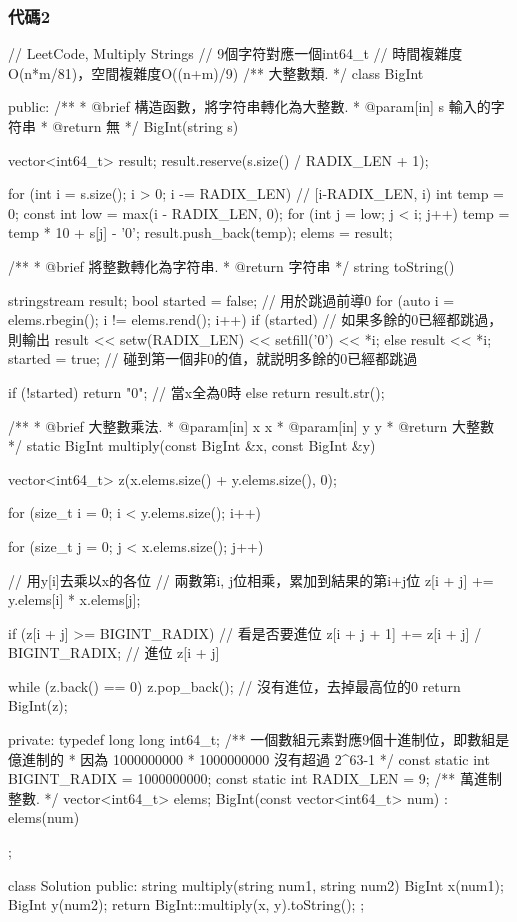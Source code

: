 \subsubsection{代碼2}
\begin{Code}
// LeetCode, Multiply Strings
// 9個字符對應一個int64_t
// 時間複雜度O(n*m/81)，空間複雜度O((n+m)/9)
/** 大整數類. */
class BigInt {
public:
    /**
     * @brief 構造函數，將字符串轉化為大整數.
     * @param[in] s 輸入的字符串
     * @return 無
     */
    BigInt(string s) {
        vector<int64_t> result;
        result.reserve(s.size() / RADIX_LEN + 1);

        for (int i = s.size(); i > 0; i -= RADIX_LEN) {  // [i-RADIX_LEN, i)
            int temp = 0;
            const int low = max(i - RADIX_LEN, 0);
            for (int j = low; j < i; j++) {
                temp = temp * 10 + s[j] - '0';
            }
            result.push_back(temp);
        }
        elems = result;
    }
    /**
     * @brief 將整數轉化為字符串.
     * @return 字符串
     */
    string toString() {
        stringstream result;
        bool started = false; // 用於跳過前導0
        for (auto i = elems.rbegin(); i != elems.rend(); i++) {
            if (started) { // 如果多餘的0已經都跳過，則輸出
                result << setw(RADIX_LEN) << setfill('0') << *i;
            } else {
                result << *i;
                started = true; // 碰到第一個非0的值，就説明多餘的0已經都跳過
            }
        }

        if (!started) return "0"; // 當x全為0時
        else return result.str();
    }

    /**
     * @brief 大整數乘法.
     * @param[in] x x
     * @param[in] y y
     * @return 大整數
     */
    static BigInt multiply(const BigInt &x, const BigInt &y) {
        vector<int64_t> z(x.elems.size() + y.elems.size(), 0);

        for (size_t i = 0; i < y.elems.size(); i++) {
            for (size_t j = 0; j < x.elems.size(); j++) { // 用y[i]去乘以x的各位
                //  兩數第i, j位相乘，累加到結果的第i+j位
                z[i + j] += y.elems[i] * x.elems[j];

                if (z[i + j] >= BIGINT_RADIX) { //  看是否要進位
                    z[i + j + 1] += z[i + j] / BIGINT_RADIX; //  進位
                    z[i + j] %
                }
            }
        }
        while (z.back() == 0) z.pop_back();  // 沒有進位，去掉最高位的0
        return BigInt(z);
    }

private:
    typedef long long int64_t;
    /** 一個數組元素對應9個十進制位，即數組是億進制的
     * 因為 1000000000 * 1000000000 沒有超過 2^63-1
     */
    const static int BIGINT_RADIX = 1000000000;
    const static int RADIX_LEN = 9;
    /** 萬進制整數. */
    vector<int64_t> elems;
    BigInt(const vector<int64_t> num) : elems(num) {}
};


class Solution {
public:
    string multiply(string num1, string num2) {
        BigInt x(num1);
        BigInt y(num2);
        return BigInt::multiply(x, y).toString();
    }
};
\end{Code}


